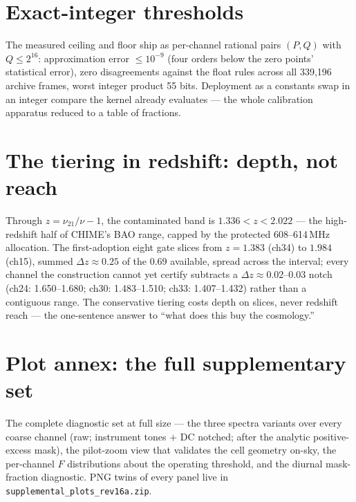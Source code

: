 \documentclass[10pt]{article}
\begin{document}
\section{Exact-integer thresholds}
The measured ceiling and floor ship as per-channel rational pairs
$(P, Q)$ with $Q \le 2^{16}$: approximation error $\le 10^{-9}$ (four
orders below the zero points' statistical error), zero disagreements
against the float rules across all 339{,}196 archive frames, worst
integer product 55 bits. Deployment as a constants swap in an integer
compare the kernel already evaluates --- the whole calibration
apparatus reduced to a table of fractions.

\section{The tiering in redshift: depth, not reach}
Through $z = \nu_{21}/\nu - 1$, the contaminated band is
$1.336 < z < 2.022$ --- the high-redshift half of CHIME's BAO range,
capped by the protected 608--614\,MHz allocation. The first-adoption
eight gate slices from $z = 1.383$ (ch34) to $1.984$ (ch15), summed
$\Delta z \approx 0.25$ of the 0.69 available, spread across the
interval; every channel the construction cannot yet certify subtracts
a $\Delta z \approx 0.02$--$0.03$ notch (ch24: 1.650--1.680; ch30:
1.483--1.510; ch33: 1.407--1.432) rather than a contiguous range. The
conservative tiering costs depth on slices, never redshift reach ---
the one-sentence answer to ``what does this buy the cosmology.''

\clearpage
\appendix
\section{Plot annex: the full supplementary set}
The complete diagnostic set at full size --- the three spectra
variants over every coarse channel (raw; instrument tones $+$ DC
notched; after the analytic positive-excess mask), the pilot-zoom
view that validates the cell geometry on-sky, the per-channel $F$
distributions about the operating threshold, and the diurnal
mask-fraction diagnostic. PNG twins of every panel live in
\texttt{supplemental\_plots\_rev16a.zip}.
\end{document}
